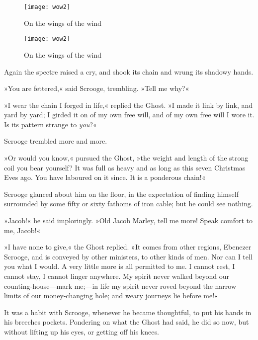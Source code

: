 \begin{letter}
	\begin{figure}[b!]
		\centering
		\texttt{[image: wow2]}
		\caption{On the wings of the wind}
	\end{figure}
\end{letter}
\begin{a4}
	\begin{figure}[b!]
		\centering
		\texttt{[image: wow2]}
		\caption{On the wings of the wind}
	\end{figure}
\end{a4}

Again the spectre raised a cry, and shook its chain and wrung its shadowy hands.

»You are fettered,« said Scrooge, trembling. »Tell me why?«

»I wear the chain I forged in life,« replied the Ghost. »I made it link by link, and yard by yard; I girded it on of my own free will, and of my own free will I wore it. Is its pattern strange to \textit{you}?«

Scrooge trembled more and more.

»Or would you know,« pursued the Ghost, »the weight and length of the strong coil you bear yourself? It was full as heavy and as long as this seven Christmas Eves ago. You have laboured on it since. It is a ponderous chain!«

Scrooge glanced about him on the floor, in the expectation of finding himself surrounded by some fifty or sixty fathoms of iron cable; but he could see nothing.

»Jacob!« he said imploringly. »Old Jacob Marley, tell me more! Speak comfort to me, Jacob!«



»I have none to give,« the Ghost replied. »It comes from other regions, Ebenezer Scrooge, and is conveyed by other ministers, to other kinds of men. Nor can I tell you what I would. A very little more is all permitted to me. I cannot rest, I cannot stay, I cannot linger anywhere. My spirit never walked beyond our counting-house---mark me;---in life my spirit never roved beyond the narrow limits of our money-changing hole; and weary journeys lie before me!«

It was a habit with Scrooge, whenever he became thoughtful, to put his hands in his breeches pockets. Pondering on what the Ghost had said, he did so now, but without lifting up his eyes, or getting off his knees.

